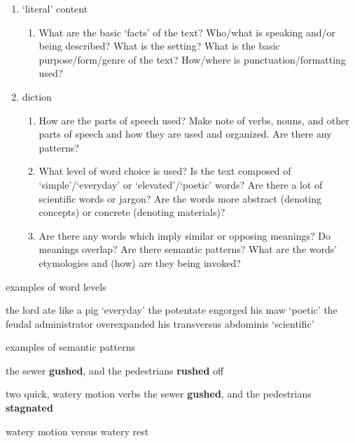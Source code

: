 \documentclass[12pt]{article}
\begin{document}
\begin{enumerate}
\item `literal' content
    \begin{enumerate}
    \item What are the basic `facts' of the text? Who/what is speaking and/or being described? What is the setting? What is the basic purpose/form/genre of the text? How/where is punctuation/formatting used?
    \end{enumerate}
\item diction
    \begin{enumerate}
    \item How are the parts of speech used? Make note of verbs, nouns, and other parts of speech and how they are used and organized. Are there any patterns?
    \item What level of word choice is used? Is the text composed of `simple'/`everyday' or `elevated'/`poetic' words? Are there a lot of scientific words or jargon? Are the words more abstract (denoting concepts) or concrete (denoting materials)?
    \item Are there any words which imply similar or opposing meanings? Do meanings overlap? Are there semantic patterns? What are the words’ etymologies and (how) are they being invoked?
    \end{enumerate}
\end{enumerate}
\begin{exe}
\ex examples of word levels
    \begin{xlist}
    \ex the lord ate like a pig \hfill `everyday'
    \ex the potentate engorged his maw \hfill `poetic'
    \ex the feudal administrator overexpanded his transversus abdominis \hfill `scientific'
    \end{xlist}
\ex examples of semantic patterns
    \begin{xlist}
    \ex the sewer \textbf{gushed}, and the pedestrians \textbf{rushed} off \par \hfill two quick, watery motion verbs
    \ex the sewer \textbf{gushed}, and the pedestrians \textbf{stagnated} \par \hfill watery motion versus watery rest
    \end{xlist}
\end{exe}
\end{document}
